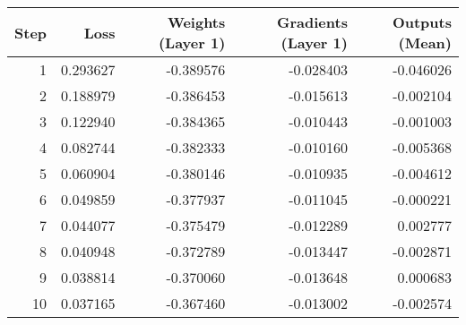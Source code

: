 \begin{tabular}{rrrrr}
\toprule
 Step &     Loss &  Weights (Layer 1) &  Gradients (Layer 1) &  Outputs (Mean) \\
\midrule
    1 & 0.293627 &          -0.389576 &            -0.028403 &       -0.046026 \\
    2 & 0.188979 &          -0.386453 &            -0.015613 &       -0.002104 \\
    3 & 0.122940 &          -0.384365 &            -0.010443 &       -0.001003 \\
    4 & 0.082744 &          -0.382333 &            -0.010160 &       -0.005368 \\
    5 & 0.060904 &          -0.380146 &            -0.010935 &       -0.004612 \\
    6 & 0.049859 &          -0.377937 &            -0.011045 &       -0.000221 \\
    7 & 0.044077 &          -0.375479 &            -0.012289 &        0.002777 \\
    8 & 0.040948 &          -0.372789 &            -0.013447 &       -0.002871 \\
    9 & 0.038814 &          -0.370060 &            -0.013648 &        0.000683 \\
   10 & 0.037165 &          -0.367460 &            -0.013002 &       -0.002574 \\
\bottomrule
\end{tabular}
